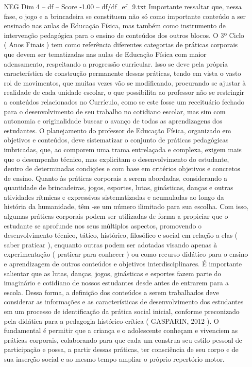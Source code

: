 \begin{textsample}{NEG Dim 4 – df – Score -1.00 – df/df\_ef\_9.txt}
Importante ressaltar que, nessa fase, o jogo e a brincadeira se constituem não só como importante conteúdo a ser ensinado nas aulas de Educação Física, mas também como instrumento de intervenção pedagógica para o ensino de conteúdos dos outros blocos.
O 3º Ciclo ( Anos Finais ) tem como referência diferentes categorias de práticas corporais que devem ser tematizadas nas aulas de Educação Física com maior adensamento, respeitando a progressão curricular.
Isso se deve pela própria característica de construção permanente dessas práticas, tendo em vista o vasto rol de movimentos, que muitas vezes vão se modificando, procurando se ajustar à realidade de cada unidade escolar, o que possibilita ao professor não se restringir a conteúdos relacionados no Currículo, como se este fosse um receituário fechado para o desenvolvimento de seu trabalho no cotidiano escolar, mas sim com autonomia e originalidade buscar o avanço de todas as aprendizagens dos estudantes.
O planejamento do professor de Educação Física, organizado em objetivos e conteúdos, deve sistematizar o conjunto de práticas pedagógicas imbricadas, que, ao comporem uma trama entrelaçada e complexa, exigem mais que o desempenho técnico, mas explicitam o desenvolvimento do estudante, dentro de determinadas condições e com base em critérios objetivos e concretos de ensino.
Quanto às práticas corporais a serem abordadas, considerando a quantidade de brincadeiras, jogos, esportes, lutas, ginásticas, danças e outras atividades rítmicas e expressivas sistematizadas e acumuladas ao longo da história da humanidade, têm -se um número ilimitado para sua escolha.
Com isso, algumas práticas corporais podem ser utilizadas de forma a propiciar que o estudante se aprofunde nos seus múltiplos aspectos, promovendo o desenvolvimento técnico, tático, histórico, filosófico e social em relação a elas ( saber praticar ), enquanto outras podem ser adotadas visando apenas à experimentação ( praticar para conhecer ) ou como recurso didático para o ensino e aprendizagem de outros conteúdos e objetivos interdisciplinares.
É importante salientar que as lutas, danças, jogos, ginásticas e esportes fazem parte do imaginário e cotidiano de nossos estudantes desde antes de entrarem para a escola.
Dessa forma, a definição dos conteúdos a serem trabalhados deve considerar as informações e as características de desenvolvimento dos estudantes em um processo de identificação da prática social inicial, conforme preconizado pela didática para a pedagogia histórico-crítica ( GASPARIN, 2012 ).
O fundamental é permitir que a criança e o adolescente conheçam e vivenciem as práticas corporais, colaborando para que cada um construa seu estilo pessoal de participação e possa, a partir dessas práticas, ter consciência de seu corpo e de sua inserção social e ao mesmo tempo ampliar o próprio repertório motor.

\end{textsample}
